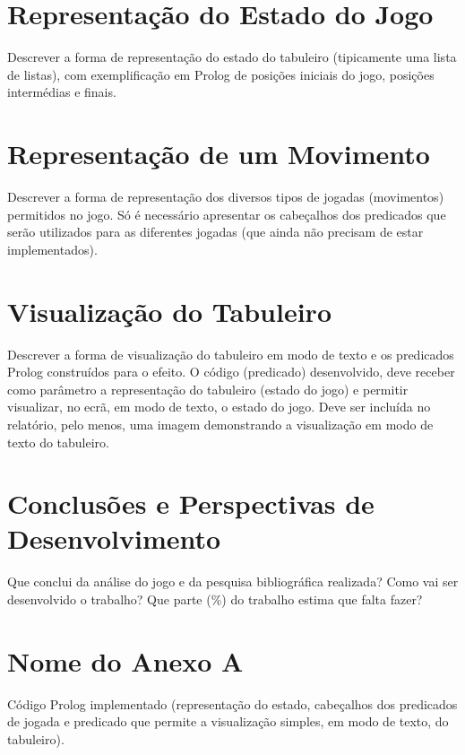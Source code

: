 \documentclass[15pt,a4paper]{article}
\begin{document}
\newpage
\section{Representação do Estado do Jogo}
Descrever a forma de representação do estado do tabuleiro (tipicamente uma lista de listas), com exemplificação em Prolog de posições iniciais do jogo, posições intermédias e finais.

\section{Representação de um Movimento}
Descrever a forma de representação dos diversos tipos de jogadas (movimentos) permitidos no jogo. Só é necessário apresentar os cabeçalhos dos predicados que serão utilizados para as diferentes jogadas (que ainda não precisam de estar implementados).

\section{Visualização do Tabuleiro}
Descrever a forma de visualização do tabuleiro em modo de texto e os predicados Prolog construídos para o efeito. O código (predicado) desenvolvido, deve receber como parâmetro a representação do tabuleiro (estado do jogo) e permitir visualizar, no ecrã, em modo de texto, o estado do jogo. Deve ser incluída no relatório, pelo menos, uma imagem demonstrando a visualização em modo de texto do tabuleiro.

\section{Conclusões e Perspectivas de Desenvolvimento}
Que conclui da análise do jogo e da pesquisa bibliográfica realizada? Como vai ser desenvolvido o trabalho? Que parte (\%) do trabalho estima que falta fazer?

\clearpage
{}
\renewcommand\refname{Bibliografia}





\newpage

\appendix
\section{Nome do Anexo A}
Código Prolog implementado (representação do estado, cabeçalhos dos predicados de jogada e predicado que permite a visualização simples, em modo de texto, do tabuleiro).
\end{document}
